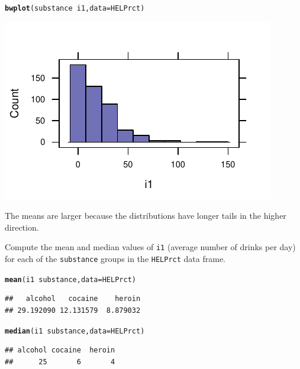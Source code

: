 \documentclass[twoside]{book}\usepackage[]{graphicx}\usepackage[]{xcolor}
\makeatletter
\def\maxwidth{ %
  \ifdim\Gin@nat@width>\linewidth
    \linewidth
  \else
    \Gin@nat@width
  \fi
}
\newcommand{\hlopt}[1]{\textcolor[rgb]{0,0,0}{#1}}%
\newcommand{\hlstd}[1]{\textcolor[rgb]{0.345,0.345,0.345}{#1}}%
\newcommand{\hlkwc}[1]{\textcolor[rgb]{0.333,0.667,0.333}{#1}}%
\newcommand{\hlkwd}[1]{\textcolor[rgb]{0.737,0.353,0.396}{\textbf{#1}}}%
\newenvironment{kframe}{%
 \def\at@end@of@kframe{}%
 \ifinner\ifhmode%
  \def\at@end@of@kframe{\end{minipage}}%
  \begin{minipage}{\columnwidth}%
 \fi\fi%
 \def\FrameCommand##1{\hskip\@totalleftmargin \hskip-\fboxsep
 \colorbox{shadecolor}{##1}\hskip-\fboxsep
     \hskip-\linewidth \hskip-\@totalleftmargin \hskip\columnwidth}%
 \MakeFramed {\advance\hsize-\width
   \@totalleftmargin\z@ \linewidth\hsize
   \@setminipage}}%
 {\par\unskip\endMakeFramed%
 \at@end@of@kframe}
\newenvironment{knitrout}{}{} %
\newcommand{\variable}[1]{{\color{green!50!black}\texttt{#1}}}
\newcommand{\Rindex}[1]{\index{\texttt{#1}}}
\newcommand{\dataframe}[1]{{\color{blue!80!black}\texttt{#1}}\Rindex{#1}}
\makeatother
\begin{document}
\begin{solution}
\begin{knitrout}
\color{fgcolor}\begin{kframe}
\begin{alltt}
\hlkwd{bwplot}\hlstd{(substance} \hlopt{~} \hlstd{i1,} \hlkwc{data} \hlstd{= HELPrct)}
\end{alltt}
\end{kframe}

{\centering \includegraphics[width=\maxwidth]{figures/fig-unnamed-chunk-34-1} 

}



\end{knitrout}
	The means are larger because the distributions have longer tails in the 
	higher direction.  
\end{solution}

\begin{problem}
	Compute the mean and median values of \variable{i1} (average number of
	drinks per day) for each of the \variable{substance} groups in the 
	\dataframe{HELPrct} data frame.
\end{problem}

\begin{solution}
\begin{knitrout}
\color{fgcolor}\begin{kframe}
\begin{alltt}
\hlkwd{mean}\hlstd{(i1} \hlopt{~} \hlstd{substance,} \hlkwc{data} \hlstd{= HELPrct)}
\end{alltt}
\begin{verbatim}
##   alcohol   cocaine    heroin 
## 29.192090 12.131579  8.879032
\end{verbatim}
\begin{alltt}
\hlkwd{median}\hlstd{(i1} \hlopt{~} \hlstd{substance,} \hlkwc{data} \hlstd{= HELPrct)}
\end{alltt}
\begin{verbatim}
## alcohol cocaine  heroin 
##      25       6       4
\end{verbatim}
\end{kframe}
\end{knitrout}
\end{solution}
\end{document}
